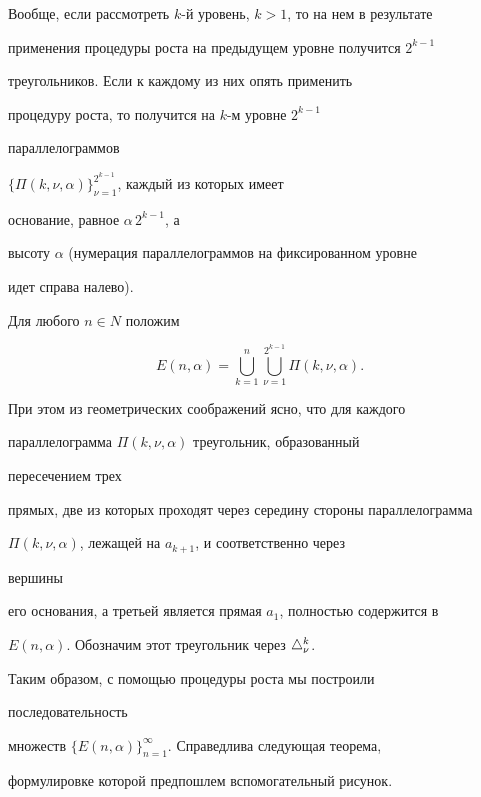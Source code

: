 \medskip


 


Вообще, если рассмотреть $k$-й уровень, $k>1$, то на нем в результате 


применения процедуры роста на предыдущем уровне получится $2^{k-1}$ 


треугольников. Если к каждому из них опять применить 


процедуру роста, то получится на $k$-м уровне $2^{k-1}$ 


параллелограммов 


$\{\Pi(k,\nu,\alpha)\}^{2^{k-1}}_{\nu=1}$, каждый из которых имеет 


основание, равное $\alpha\,2^{k-1}$, а 


высоту $\alpha$ (нумерация параллелограммов на фиксированном уровне 


идет справа налево). 


 


Для любого $n\in N$ положим 


$$ 


E(n,\alpha)=\bigcup^n_{k=1}\bigcup^{2^{k-1}}_{\nu=1} 


\Pi(k,\nu,\alpha). 


$$ 


 


При этом из геометрических соображений ясно, что для каждого 


параллелограмма $\Pi(k,\nu,\alpha)$ треугольник, образованный 


пересечением трех 


прямых, две из которых проходят через середину стороны параллелограмма 


$\Pi(k,\nu,\alpha)$, лежащей на $a_{k+1}$, и соответственно через 


вершины 


его основания, а третьей является прямая $a_1$, полностью содержится в 


$E(n,\alpha)$. Обозначим этот треугольник через $\bigtriangleup^k_\nu$. 


 


Таким образом, с помощью процедуры роста мы построили 


последовательность 


множеств $\{E(n,\alpha)\}^\infty_{n=1}$. Справедлива следующая теорема, 


формулировке которой предпошлем вспомогательный рисунок. 


